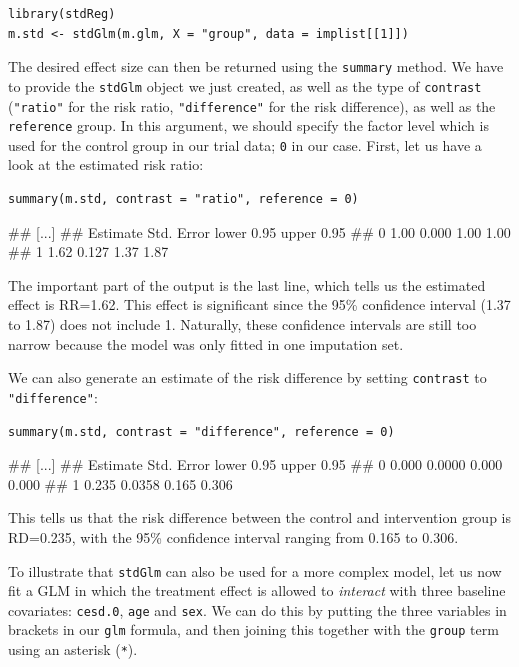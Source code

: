 \begin{lstlisting}
library(stdReg)
m.std <- stdGlm(m.glm, X = "group", data = implist[[1]])
\end{lstlisting}

The desired effect size can then be returned using the \texttt{summary} method. We have to provide the \texttt{stdGlm} object we just created, as well as the type of \texttt{contrast} (\texttt{"ratio"} for the risk ratio, \texttt{"difference"} for the risk difference), as well as the \texttt{reference} group. In this argument, we should specify the factor level which is used for the control group in our trial data; \texttt{0} in our case. First, let us have a look at the estimated risk ratio:

\begin{lstlisting}
summary(m.std, contrast = "ratio", reference = 0)  
\end{lstlisting}

\begin{example}
## [...]
##   Estimate Std. Error lower 0.95 upper 0.95
## 0     1.00      0.000       1.00       1.00
## 1     1.62      0.127       1.37       1.87
\end{example}

The important part of the output is the last line, which tells us the estimated effect is RR=1.62. This effect is significant since the 95\% confidence interval (1.37 to 1.87) does not include 1. Naturally, these confidence intervals are still too narrow because the model was only fitted in one imputation set. 

We can also generate an estimate of the risk difference by setting \texttt{contrast} to \texttt{"difference"}:

\begin{lstlisting}
summary(m.std, contrast = "difference", reference = 0)  
\end{lstlisting}

\begin{example}
## [...]
##   Estimate Std. Error lower 0.95 upper 0.95
## 0    0.000     0.0000      0.000      0.000
## 1    0.235     0.0358      0.165      0.306
\end{example}

This tells us that the risk difference between the control and intervention group is RD=0.235, with the 95\% confidence interval ranging from 0.165 to 0.306.

To illustrate that \texttt{stdGlm} can also be used for a more complex model, let us now fit a GLM in which the treatment effect is allowed to \emph{interact} with three baseline covariates: \texttt{cesd.0}, \texttt{age} and \texttt{sex}. We can do this by putting the three variables in brackets in our \texttt{glm} formula, and then joining this together with the \texttt{group} term using an asterisk (\texttt{*}).


